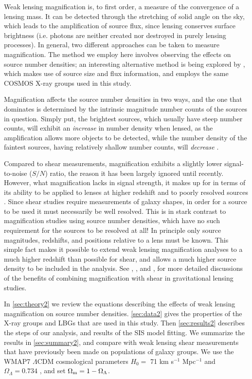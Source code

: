 Weak lensing magnification is, to first order, a measure of the convergence of a lensing mass.  It can be detected through the stretching of solid angle on the sky, which leads to the amplification of source flux, since lensing conserves surface brightness (i.e. photons are neither created nor destroyed in purely lensing processes). In general, two different approaches can be taken to measure magnification.  The method we employ here involves observing the effects on source number densities; an interesting alternative method is being explored by \citet{Schmidt12}, which makes use of source size and flux information, and employs the same \ac{COSMOS} X-ray groups used in this study.

Magnification affects the source number densities in two ways, and the one that dominates is determined by the intrinsic magnitude number counts of the sources in question.  Simply put, the brightest sources, which usually have steep number counts, will exhibit an {\it increase} in number density when lensed, as the amplification allows more objects to be detected, while the number density of the faintest sources, having relatively shallow number counts, will {\it decrease} \citep{Narayan89}.

Compared to shear measurements, magnification exhibits a slightly lower signal-to-noise ($S/N$) ratio, the reason it has been largely ignored until recently.  However, what magnification lacks in signal strength, it makes up for in terms of its ability to be applied to lenses at higher redshift and to poorly resolved sources \citep{Waerbeke10}.  Since shear studies require measurements of galaxy shapes, in order for a source to be used it must necessarily be well resolved.  This is in stark contrast to magnification studies using source number densities, which have no such requirement for the sources to be resolved at all!  In principle only source magnitudes, redshifts, and positions relative to a lens must be known.  This simple fact makes it possible to extend weak lensing magnification analyses to a much higher redshift than possible for shear, and allows a much higher source density to be included in the analysis.  See \citet{Waerbeke10}, \citet{RozoSchmidt10}, and \citet{Umetsu11}, for more detailed discussions of the benefits of combining magnification with shear in gravitational lensing studies. 

In \autoref{sec:theory2} we review the equations describing the effects of weak lensing magnification on source number densities.  \autoref{sec:data2} gives the properties of the X-ray groups and \ac{LBG}s that are used in this study.  Then \autoref{sec:results2} describes the steps of our analysis, and results of the \ac{SIS} model fitting.  We summarize the results in \autoref{sec:summary2}, and compare with weak lensing shear measurements that have previously been made on populations of galaxy groups.  We use the WMAP7 $\Lambda$CDM cosmological parameters $H_0 =$ 71 km s$^{-1}$ Mpc$^{-1}$ and $\Omega_{\Lambda} = 0.734$ \citep{WMAP7}, and set $\Omega_{\rm m} = 1 - \Omega_{\Lambda}$.

